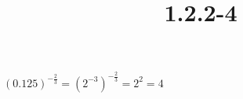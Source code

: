 \documentclass{article}
\title{1.2.2-4}
\begin{document}
\maketitle

$(0.125)^{-\frac{2}{3}} = (2^{-3})^{-\frac{2}{3}} = 2^2 = 4$
\end{document}
